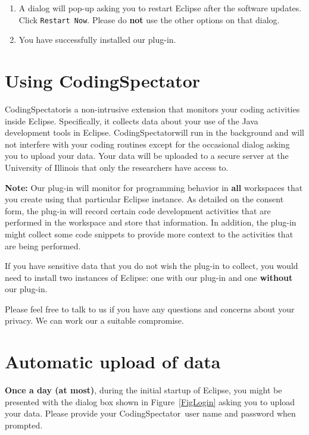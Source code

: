 \documentclass{article}
\newcommand{\fig}[1]{\imgsrc{#1.png}}
\newcommand\fig[1]{\texttt{[image: \#1]}}%
\newcommand\codspec{CodingSpectator}
\newcommand\infonote[1]{\textbf{Note: }#1}
\newcommand\uiref[1]{\texttt{#1}}
\begin{document}
\begin{enumerate}
\begin{figure}[h]
%
\centering
%
\fig{figs/warning}
%
\caption{\label{FigUnsignedWarning}The dialog that warns about unsigned content
implies that Eclipse has failed to install \codspec.}
%
\end{figure}

\item A dialog will pop-up asking you to restart Eclipse after the software
updates. Click \uiref{Restart Now}. Please do \textbf{not} use the other options
on that dialog.

\item You have successfully installed our plug-in.
%
\end{enumerate}
%
\section{Using \codspec}
%
\codspec is a non-intrusive extension that monitors your coding activities
inside Eclipse. Specifically, it collects data about your use of the Java
development tools in Eclipse. \codspec will run in the background and will not
interfere with your coding routines except for the occasional dialog asking you
to upload your data. Your data will be uploaded to a secure server at the
University of Illinois that only the researchers have access to.

\infonote{Our plug-in will monitor for programming behavior in \textbf{all}
workspaces that you create using that particular Eclipse instance. As detailed
on the consent form, the plug-in will record certain code development activities
that are performed in the workspace and store that information. In addition, the
plug-in might collect some code snippets to provide more context to the
activities that are being performed.

If you have sensitive data that you do not wish the plug-in to collect, you
would need to install two instances of Eclipse: one with our plug-in and one
\textbf{without} our plug-in.

Please feel free to talk to us if you have any questions and concerns about your
privacy. We can work our a suitable compromise.}
%
\section{Automatic upload of data}

\textbf{Once a day (at most)}, during the initial startup of Eclipse, you might
be presented with the dialog box shown in Figure~\ref{FigLogin} asking you to
upload your data. Please provide your \codspec\ user name and password when
prompted.
\end{document}
